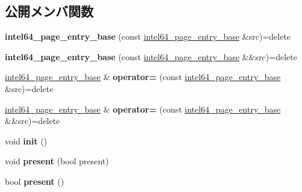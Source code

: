 \subsection*{公開メンバ関数}
\begin{DoxyCompactItemize}
\item 
\hypertarget{classintel64__page__entry__base_aeea4d63f52154f203bf6a3a834eddb6d}{}{\bfseries intel64\+\_\+page\+\_\+entry\+\_\+base} (const \hyperlink{classintel64__page__entry__base}{intel64\+\_\+page\+\_\+entry\+\_\+base} \&src)=delete\label{classintel64__page__entry__base_aeea4d63f52154f203bf6a3a834eddb6d}

\item 
\hypertarget{classintel64__page__entry__base_a6590bbc362f52b6e0a2480e02f3e3eb6}{}{\bfseries intel64\+\_\+page\+\_\+entry\+\_\+base} (const \hyperlink{classintel64__page__entry__base}{intel64\+\_\+page\+\_\+entry\+\_\+base} \&\&src)=delete\label{classintel64__page__entry__base_a6590bbc362f52b6e0a2480e02f3e3eb6}

\item 
\hypertarget{classintel64__page__entry__base_a3d3172d56b2753c79b5d8f92aa186f6d}{}\hyperlink{classintel64__page__entry__base}{intel64\+\_\+page\+\_\+entry\+\_\+base} \& {\bfseries operator=} (const \hyperlink{classintel64__page__entry__base}{intel64\+\_\+page\+\_\+entry\+\_\+base} \&src)=delete\label{classintel64__page__entry__base_a3d3172d56b2753c79b5d8f92aa186f6d}

\item 
\hypertarget{classintel64__page__entry__base_a4d369c95ee68ab21c0e56e3b82752b39}{}\hyperlink{classintel64__page__entry__base}{intel64\+\_\+page\+\_\+entry\+\_\+base} \& {\bfseries operator=} (const \hyperlink{classintel64__page__entry__base}{intel64\+\_\+page\+\_\+entry\+\_\+base} \&\&src)=delete\label{classintel64__page__entry__base_a4d369c95ee68ab21c0e56e3b82752b39}

\item 
\hypertarget{classintel64__page__entry__base_a3335b0b3dfaae7c73cd1c5fbc162aaf8}{}void {\bfseries init} ()\label{classintel64__page__entry__base_a3335b0b3dfaae7c73cd1c5fbc162aaf8}

\item 
\hypertarget{classintel64__page__entry__base_a4fcb76a49ecb6fbb355d56879db69f2e}{}void {\bfseries present} (bool present)\label{classintel64__page__entry__base_a4fcb76a49ecb6fbb355d56879db69f2e}

\item 
\hypertarget{classintel64__page__entry__base_a7d3ef460bab67263f3804911070a89b8}{}bool {\bfseries present} ()\label{classintel64__page__entry__base_a7d3ef460bab67263f3804911070a89b8}


\end{DoxyCompactItemize}
